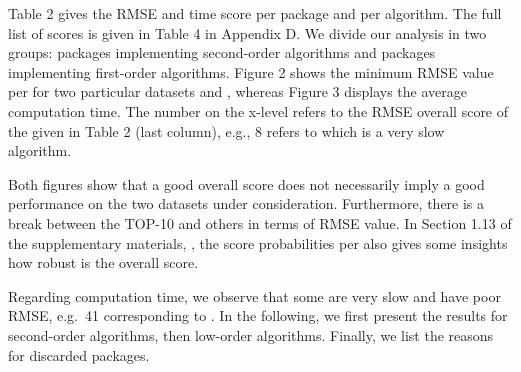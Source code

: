 Table 2 gives the RMSE and time score per package and per algorithm. The
full list of scores is given in Table 4 in Appendix D. We divide our
analysis in two groups: packages implementing second-order algorithms
and packages implementing first-order algorithms. Figure 2 shows the
minimum RMSE value per  for two particular
datasets  and , whereas Figure 3
displays the average computation time. The number on the x-level refers
to the RMSE overall score of the  given in Table
2 (last column), e.g., 8 refers to  which is a
very slow algorithm.

Both figures show that a good overall score does not necessarily imply a
good performance on the two datasets under consideration. Furthermore,
there is a break between the TOP-10  and others
in terms of RMSE value. In Section 1.13 of the supplementary materials,
\citep{suppl:material:paper}, the score probabilities per
 also gives some insights how robust is the
overall score.

Regarding computation time, we observe that some
 are very slow and have poor RMSE, e.g.~41
corresponding to . In the following, we first
present the results for second-order algorithms, then low-order
algorithms. Finally, we list the reasons for discarded packages.

